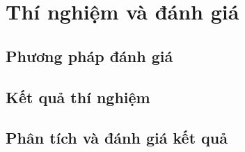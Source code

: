 \section{Thí nghiệm và đánh giá}
\subsection{Phương pháp đánh giá}
\subsection{Kết quả thí nghiệm}
\subsection{Phân tích và đánh giá kết quả}
